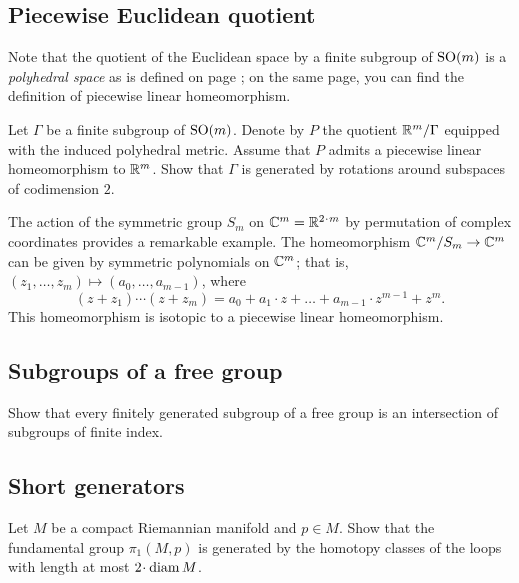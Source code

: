 \subsection*{Piecewise Euclidean quotient}\label{Piecewise Euclidean quotient}

Note that the quotient of the Euclidean space by a finite subgroup of $\mathrm{SO}(m)$ is a {}\emph{polyhedral space} as is defined on page \pageref{piecewise linear map};
on the same page, you can find the definition of piecewise linear homeomorphism.


\begin{pr}
Let $\Gamma$ be a finite subgroup of $\mathrm{SO}(m)$.
Denote by $P$ the quotient $\mathbb{R}^m/\Gamma$ equipped with the induced
polyhedral metric.
Assume that $P$ admits a piecewise linear homeomorphism to $\mathbb{R}^m$.
Show that $\Gamma$ is generated by rotations  around subspaces of codimension $2$.
\end{pr}

The action of the symmetric group $S_m$ on $\CC^m=\RR^{2\cdot m}$ by permutation of complex coordinates provides a remarkable example.
The homeomorphism $\mathbb{C}^m/S_m\to \mathbb{C}^m$ can be given by symmetric polynomials on $\mathbb{C}^m$;
that is, $(z_1,\dots,z_m)\mapsto (a_0,\dots,a_{m-1})$, where
\[(z+z_1)\cdots(z+z_m)=a_0+a_1\cdot z+\dots+a_{m-1}\cdot z^{m-1}+z^m.\]
This homeomorphism is isotopic to a piecewise linear homeomorphism.

\subsection*{Subgroups of a free group}\label{Subgroups of free group} 

\begin{pr}
Show that every finitely generated subgroup of a free group 
is an intersection of subgroups of finite index.
\end{pr}

\subsection*{Short generators\easy}\label{Lengths of generators of the fundamental group}

\begin{pr}
Let $M$ be a compact Riemannian manifold and $p\in M$.
Show that the fundamental group $\pi_1(M,p)$
is generated by the homotopy classes of the loops with length at most $2\cdot\diam M$.
\end{pr}

